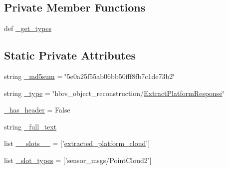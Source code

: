 \subsection*{\-Private \-Member \-Functions}
\begin{DoxyCompactItemize}
\item 
def \hyperlink{classhbrs__object__reconstruction_1_1srv_1_1___extract_platform_1_1_extract_platform_response_af55cec06fa41c8fb9503263731845750}{\-\_\-get\-\_\-types}
\end{DoxyCompactItemize}
\subsection*{\-Static \-Private \-Attributes}
\begin{DoxyCompactItemize}
\item 
string \hyperlink{classhbrs__object__reconstruction_1_1srv_1_1___extract_platform_1_1_extract_platform_response_a64905d77f71ac9cc825b75cf49d017a5}{\-\_\-md5sum} = \char`\"{}5e0a25f55ab06bb50fff8fb7c1de73b2\char`\"{}
\item 
string \hyperlink{classhbrs__object__reconstruction_1_1srv_1_1___extract_platform_1_1_extract_platform_response_a96d608a37e74683af279b4a10efb48dd}{\-\_\-type} = \char`\"{}hbrs\-\_\-object\-\_\-reconstruction/\hyperlink{classhbrs__object__reconstruction_1_1srv_1_1___extract_platform_1_1_extract_platform_response}{\-Extract\-Platform\-Response}\char`\"{}
\item 
\hyperlink{classhbrs__object__reconstruction_1_1srv_1_1___extract_platform_1_1_extract_platform_response_ad82a2fd14af07b035fcd68218521380c}{\-\_\-has\-\_\-header} = \-False
\item 
string \hyperlink{classhbrs__object__reconstruction_1_1srv_1_1___extract_platform_1_1_extract_platform_response_a249613cc9ad2e6fab9476a659314baa6}{\-\_\-full\-\_\-text}
\item 
list \hyperlink{classhbrs__object__reconstruction_1_1srv_1_1___extract_platform_1_1_extract_platform_response_a1fc0af6c957465ad1013c25ed500fa16}{\-\_\-\-\_\-slots\-\_\-\-\_\-} = \mbox{[}'\hyperlink{classhbrs__object__reconstruction_1_1srv_1_1___extract_platform_1_1_extract_platform_response_a541133d8573de59877d757d4412cc1b1}{extracted\-\_\-platform\-\_\-cloud}'\mbox{]}
\item 
list \hyperlink{classhbrs__object__reconstruction_1_1srv_1_1___extract_platform_1_1_extract_platform_response_ad27e860962302c36547f33a0fe3ca397}{\-\_\-slot\-\_\-types} = \mbox{[}'sensor\-\_\-msgs/\-Point\-Cloud2'\mbox{]}
\end{DoxyCompactItemize}


